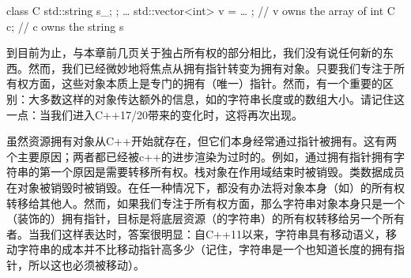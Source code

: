 \begin{code}
class C {
  std::string s_;
};
 …
std::vector<int> v = … ;    // v owns the array of int
C c;                       // c owns the string s
\end{code}

到目前为止，与本章前几页关于独占所有权的部分相比，我们没有说任何新的东西。然而，我们已经微妙地将焦点从拥有指针转变为拥有对象。只要我们专注于所有权方面，这些对象本质上是专门的拥有（唯一）指针。然而，有一个重要的区别：大多数这样的对象传达额外的信息，如的字符串长度或的数组大小。请记住这一点：当我们进入C++17/20带来的变化时，这将再次出现。

虽然资源拥有对象从C++开始就存在，但它们本身经常通过指针被拥有。这有两个主要原因；两者都已经被c++的进步渲染为过时的。例如，通过拥有指针拥有字符串的第一个原因是需要转移所有权。栈对象在作用域结束时被销毁。类数据成员在对象被销毁时被销毁。在任一种情况下，都没有办法将对象本身（如）的所有权转移给其他人。然而，如果我们专注于所有权方面，那么字符串对象本身只是一个（装饰的）拥有指针，目标是将底层资源（的字符串）的所有权转移给另一个所有者。当我们这样表达时，答案很明显：自C++11以来，字符串具有移动语义，移动字符串的成本并不比移动指针高多少（记住，字符串是一个也知道长度的拥有指针，所以这也必须被移动）。

